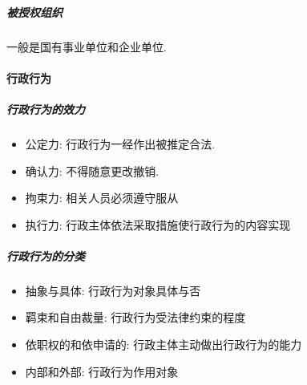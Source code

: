 \subparagraph{被授权组织} 一般是国有事业单位和企业单位.

\paragraph{行政行为} 

\subparagraph{行政行为的效力}

\begin{itemize}
    \item 公定力: 行政行为一经作出被推定合法.
    \item 确认力: 不得随意更改撤销.
    \item 拘束力: 相关人员必须遵守服从
    \item 执行力: 行政主体依法采取措施使行政行为的内容实现
\end{itemize}

\subparagraph{行政行为的分类}

\begin{itemize}
    \item 抽象与具体: 行政行为对象具体与否
    \item 羁束和自由裁量: 行政行为受法律约束的程度
    \item 依职权的和依申请的: 行政主体主动做出行政行为的能力
    \item 内部和外部: 行政行为作用对象
\end{itemize}




